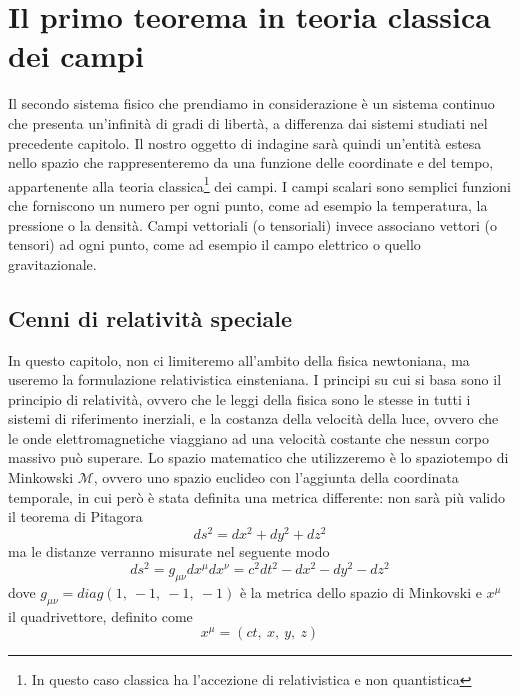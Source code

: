 \chapter{Il primo teorema in teoria classica dei campi}

    Il secondo sistema fisico che prendiamo in considerazione è un sistema continuo che presenta un'infinità di gradi di libertà, a differenza dai sistemi studiati nel precedente capitolo. Il nostro oggetto di indagine sarà quindi un'entità estesa nello spazio che rappresenteremo da una funzione delle coordinate e del tempo, appartenente alla teoria classica\footnote{In questo caso classica ha l'accezione di relativistica e non quantistica} dei campi. I campi scalari sono semplici funzioni che forniscono un numero per ogni punto, come ad esempio la temperatura, la pressione o la densità. Campi vettoriali (o tensoriali) invece associano vettori (o tensori) ad ogni punto, come ad esempio il campo elettrico o quello gravitazionale.

\section{Cenni di relatività speciale}
    In questo capitolo, non ci limiteremo all'ambito della fisica newtoniana, ma useremo la formulazione relativistica einsteniana. I principi su cui si basa sono il principio di relatività, ovvero che le leggi della fisica sono le stesse in tutti i sistemi di riferimento inerziali, e la costanza della velocità della luce, ovvero che le onde elettromagnetiche viaggiano ad una velocità costante che nessun corpo massivo può superare. Lo spazio matematico che utilizzeremo è lo spaziotempo di Minkowski $\mathcal M$, ovvero uno spazio euclideo con l'aggiunta della coordinata temporale, in cui però è stata definita una metrica differente: non sarà più valido il teorema di Pitagora 
    \begin{equation*}
        ds^2 = dx^2 + dy^2 + dz^2
    \end{equation*}
    ma le distanze verranno misurate nel seguente modo
    \begin{equation*}
        ds^2 = g_{\mu\nu} dx^\mu dx^\nu = c^2 dt^2 - dx^2 - dy^2 - dz^2
    \end{equation*}
    dove $g_{\mu\nu} = diag(1,~-1,~-1,~-1)$ è la metrica dello spazio di Minkovski e $x^\mu$ il quadrivettore, definito come 
    \begin{equation*}
        x^\mu = (ct,~x,~y,~z)
    \end{equation*}
    
